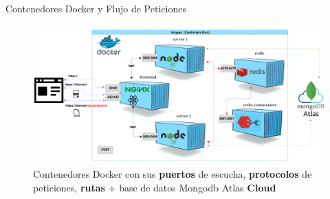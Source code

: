 \documentclass[xcolor=pdftex,dvipsnames,table]{beamer}
\begin{document}
\begin{frame}{Contenedores Docker y Flujo de Peticiones}
    \begin{figure}[htb]
        \centering
        \captionsetup{justification=centering,margin=0.5cm}
        \includegraphics[width=1\linewidth]{implementacion/dockercontainers.png}
        \caption*{Contenedores Docker con sus  \textbf{puertos} de escucha,  \textbf{protocolos} de peticiones,  \textbf{rutas} +  base de datos Mongodb Atlas \textbf{Cloud}}
    \end{figure}   
\end{frame}
\end{document}
